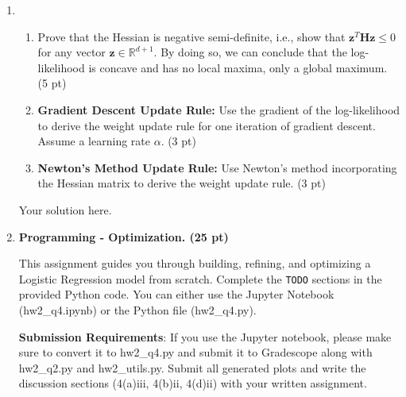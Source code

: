\documentclass{article}
\theoremstyle{definition}
\theoremstyle{remark}
\newenvironment{Q}
        {%
          \clearpage
          \item
        }
        {%
          \phantom{s} %
          \bigskip
        }
\begin{document}
\begin{enumerate}[font={\Large\bfseries},left=0pt]
\begin{Q}
\begin{enumerate}
        \item Prove that the Hessian is negative semi-definite, i.e., show that $\bm{z}^T \bm{H} \bm{z} \leq 0$ for any vector $\bm{z} \in \mathbb{R}^{d+1}$. By doing so, we can conclude that the log-likelihood is concave and has no local maxima, only a global maximum.   (5 pt)
        \item \textbf{Gradient Descent Update Rule:} Use the gradient of the log-likelihood to derive the weight update rule for one iteration of gradient descent. Assume a learning rate $\alpha$.  (3 pt)
    
        \item \textbf{Newton’s Method Update Rule:} Use Newton’s method incorporating the Hessian matrix to derive the weight update rule.  (3 pt)

 \end{enumerate}
 \end{Q}
\begin{tcolorbox}
    Your solution here.
\end{tcolorbox}
\begin{Q}
   \textbf{\Large Programming - Optimization. (25 pt)} 
   
This assignment guides you through building, refining, and optimizing a Logistic Regression model from scratch. Complete the \texttt{TODO} sections in the provided Python code. You can either use the Jupyter Notebook (hw2\_q4.ipynb) or the Python file (hw2\_q4.py). 

\textbf{Submission Requirements}: If you use the Jupyter notebook, please make sure to convert it to hw2\_q4.py and submit it to Gradescope along with hw2\_q2.py and hw2\_utils.py. Submit all generated plots and write the discussion sections (4(a)iii, 4(b)ii, 4(d)ii) with your written assignment.


\end{Q}
\end{enumerate}
\end{document}
